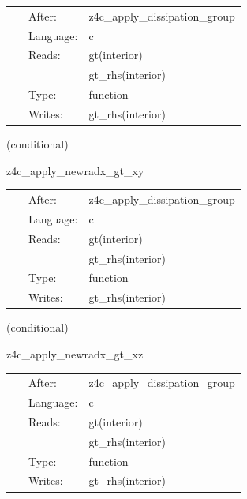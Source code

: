  \begin{tabular*}{160mm}{cll} 
~ & After:  & z4c\_apply\_dissipation\_group \\ 
~ & Language:  & c \\ 
~ & Reads:  & gt(interior) \\ 
~& ~ &gt\_rhs(interior)\\ 
~ & Type:  & function \\ 
~ & Writes:  & gt\_rhs(interior) \\ 
\end{tabular*} 


\vspace{5mm}

   (conditional) 

\hspace{5mm} z4c\_apply\_newradx\_gt\_xy 



\hspace{5mm}

 \begin{tabular*}{160mm}{cll} 
~ & After:  & z4c\_apply\_dissipation\_group \\ 
~ & Language:  & c \\ 
~ & Reads:  & gt(interior) \\ 
~& ~ &gt\_rhs(interior)\\ 
~ & Type:  & function \\ 
~ & Writes:  & gt\_rhs(interior) \\ 
\end{tabular*} 


\vspace{5mm}

   (conditional) 

\hspace{5mm} z4c\_apply\_newradx\_gt\_xz 



\hspace{5mm}

 \begin{tabular*}{160mm}{cll} 
~ & After:  & z4c\_apply\_dissipation\_group \\ 
~ & Language:  & c \\ 
~ & Reads:  & gt(interior) \\ 
~& ~ &gt\_rhs(interior)\\ 
~ & Type:  & function \\ 
~ & Writes:  & gt\_rhs(interior) \\ 
\end{tabular*} 


